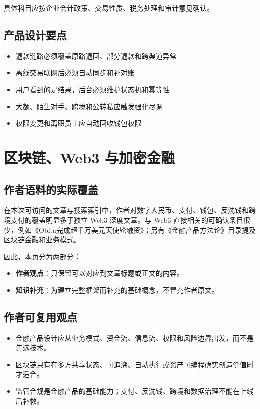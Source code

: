 具体科目应按企业会计政策、交易性质、税务处理和审计意见确认。

\section{产品设计要点}\label{ux4ea7ux54c1ux8bbeux8ba1ux8981ux70b9}

\begin{itemize}
\tightlist
\item
  退款链路必须覆盖原路退回、部分退款和跨渠道异常
\item
  离线交易联网后必须自动同步和补对账
\item
  用户看到的是结果，后台必须维护状态机和幂等性
\item
  大额、陌生对手、跨境和公转私应触发强化尽调
\item
  权限变更和离职员工应自动回收钱包权限
\end{itemize}

\chapter{区块链、Web3
与加密金融}\label{ux533aux5757ux94feweb3-ux4e0eux52a0ux5bc6ux91d1ux878d}

\section{作者语料的实际覆盖}\label{ux4f5cux8005ux8bedux6599ux7684ux5b9eux9645ux8986ux76d6}

在本次可访问的文章与搜索索引中，作者对数字人民币、支付、钱包、反洗钱和跨境支付的覆盖明显多于独立
Web3 深度文章。与 Web3
直接相关的可确认条目很少，例如《Obita完成超千万美元天使轮融资》；另有《金融产品方法论》目录提及区块链金融和业务模式。

因此，本页分为两部分：

\begin{itemize}
\tightlist
\item
  \textbf{作者观点}：只保留可以对应到文章标题或正文的内容。
\item
  \textbf{知识补充}：为建立完整框架而补充的基础概念，不冒充作者原文。
\end{itemize}

\section{作者可复用观点}\label{ux4f5cux8005ux53efux590dux7528ux89c2ux70b9}

\begin{itemize}
\tightlist
\item
  金融产品设计应从业务模式、资金流、信息流、权限和风险边界出发，而不是先选技术。
\item
  区块链只有在多方共享状态、可追溯、自动执行或资产可编程确实创造价值时才适合。
\item
  监管合规是金融产品的基础能力；支付、反洗钱、跨境和数据治理不能在上线后补救。
\end{itemize}

